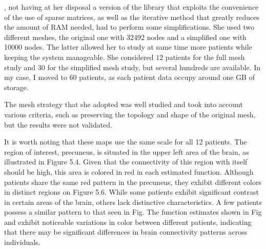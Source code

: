 \citeauthor{kim}, not having at her disposal a version of the library that exploits
the convenience of the use of sparse matrices, as well as the iterative method that
greatly reduces the amount of RAM needed, had to perform some simplifications.
She used two different meshes, the original one with 32492 nodes
and a simplified one with 10000 nodes. The latter allowed her to study at same time
more patients while keeping the system manageable.
She considered $12$ patients for the full mesh study and $30$ for
the simplified mesh study, but several hundreds are available.
In my case, I moved to $60$ patients, as each patient data occupy around
one GB of storage.

The mesh strategy that she adopted was well studied and took into account various criteria, such as
preserving the topology and shape of the original mesh, but the results were not
validated.

It is worth noting that these maps use the same scale for all 12
patients. The region of interest, precuneus, is situated in the upper left area
of the brain, as illustrated in Figure 5.4. Given that the connectivity of this
region with itself should be high, this area is colored in red in each
estimated function. Although patients share the same red pattern in the
precuneus, they exhibit different colors in distinct regions on Figure 5.6.
While some patients exhibit significant contrast in certain areas of the brain,
others lack distinctive characteristics. A few patients possess a similar
pattern to that seen in Fig. The function estimates shown in Fig
and exhibit noticeable variations in color between different patients,
indicating that there may be significant differences in brain connectivity
patterns across individuals.
